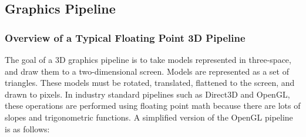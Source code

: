 \documentclass[onecolumn]{IEEEtran}
\begin{document}
\subsection{Graphics Pipeline}
\subsubsection{Overview of a Typical Floating Point 3D Pipeline}
The goal of a 3D graphics pipeline is to take models represented in three-space, and draw them to a two-dimensional screen.  Models are represented as a set of triangles.  These models must be rotated, translated, flattened to the screen, and drawn to pixels.  In industry standard pipelines such as Direct3D and OpenGL, these operations are performed using floating point math because there are lots of slopes and trigonometric functions.  A simplified version of the OpenGL pipeline is as follows:
\end{document}

